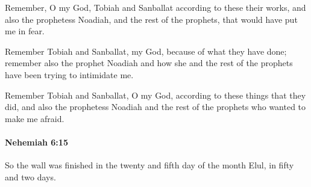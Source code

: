 			\begin{versebox}
					\item[BHS] 
					\item[LXX] 
					\item[ASV] Remember, O my God, Tobiah and Sanballat according to these their works, and also the prophetess Noadiah, and the rest of the prophets, that would have put me in fear.
					\item[NIV] Remember Tobiah and Sanballat, my God, because of what they have done; remember also the prophet Noadiah and how she and the rest of the prophets have been trying to intimidate me.
					\item[NRSV] Remember Tobiah and Sanballat, O my God, according to these things that they did, and also the prophetess Noadiah and the rest of the prophets who wanted to make me afraid.
			\end{versebox}

		\paragraph{Nehemiah 6:15} %
			\label{NEHEMIAH-6-15}

			So the wall was finished in the twenty and fifth day of the month Elul, in fifty and two days.

